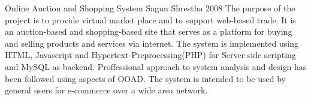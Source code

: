  \begin{conf-abstract}[]
{Online Auction and Shopping System}
{
Sagun Shrestha
}
{2008}
The purpose of the project is to provide virtual market place and to support web-based trade. It is an auction-based and shopping-based site that serves as a platform for buying and selling products and services via internet. The system is implemented using HTML, Javascript and Hypertext-Preprocessing(PHP) for Server-side scripting and MySQL as backend. Proffessional approach to system analysis and design has been followed using aspects of OOAD. The system is intended to be used by general users for e-commerce over a wide area network.
  \end{conf-abstract}